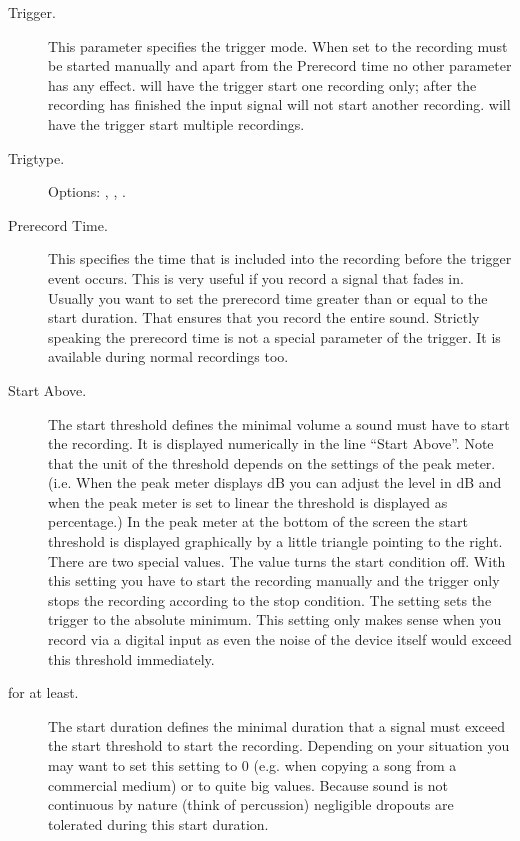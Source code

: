   \begin{description}
  \item[Trigger.]
    This parameter specifies the trigger mode.  When set to 
    the recording must be started manually and apart from the Prerecord time no
    other parameter has any effect.   will have the trigger start
    one recording only; after the recording has finished the input signal will
    not start another recording.  will have the trigger start 
    multiple recordings.
    
  \item[Trigtype.]
    Options: , , .
    
  \item[Prerecord Time.]
    This specifies the time that is included into the recording before the
    trigger event occurs. This is very useful if you record a signal that
    fades in. Usually you want to set the prerecord time greater than or
    equal to the start duration. That ensures that you record the entire
    sound. Strictly speaking the prerecord time is not a special parameter
    of the trigger. It is available during normal recordings too.
    
  \item[Start Above.]
    The start threshold defines the minimal volume a sound must have to start the
    recording. It is displayed numerically in the line ``Start Above''. Note that
    the unit of the threshold depends on the settings of the peak meter. (i.e.
    When the peak meter displays dB you can adjust the level in dB and when the
    peak meter is set to linear the threshold is displayed as percentage.) In the
    peak meter at the bottom of the screen the start threshold is displayed
    graphically by a little triangle pointing to the right. There are two special
    values. The value  turns the start condition off.  With this
    setting you have to start the recording manually and the trigger only stops
    the recording according to the stop condition. The setting 
    sets the trigger to the absolute minimum. This setting only makes sense when
    you record via a digital input as even the noise of the device itself would
    exceed this threshold immediately.
    
  \item[for at least.]
    The start duration defines the minimal duration that a signal must exceed the
    start threshold to start the recording. Depending on your situation you may
    want to set this setting to 0 (e.g. when copying a song from a commercial
    medium) or to quite big values. Because sound is not continuous by nature
    (think of percussion) negligible dropouts are tolerated during this start
    duration.
    

\end{description}
